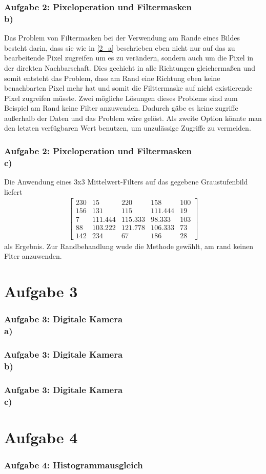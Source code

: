\documentclass[accentcolor=tud1a,colorbacktitle,inverttitle,landscape,german,presentation,t]{tudbeamer}
\begin{document}
	\begin{frame}
		\frametitle{Aufgabe 2: Pixeloperation und Filtermasken \\ b)}
		Das Problem von Filtermasken bei der Verwendung am Rande eines Bildes besteht darin, dass sie wie in \ref{2_a} beschrieben eben nicht nur auf das zu bearbeitende Pixel zugreifen um es  zu verändern, sondern auch um die Pixel in der direkten Nachbarschaft. Dies gechieht in alle Richtungen gleichermaßen und somit entsteht das Problem, dass am Rand eine Richtung eben keine benachbarten Pixel mehr hat und somit die Filttermaske auf nicht existierende Pixel zugreifen müsste. Zwei mögliche Lösungen dieses Problems sind zum Beispiel am Rand keine Filter anzuwenden. Dadurch gäbe es keine zugriffe außerhalb der Daten und das Problem wäre gelöst. Als zweite Option könnte man den letzten verfügbaren Wert benutzen, um unzulässige Zugriffe zu vermeiden. 
	\end{frame}
	
	\begin{frame}
		\frametitle{Aufgabe 2: Pixeloperation und Filtermasken \\ c)}
	
		Die Anwendung eines 3x3 Mittelwert-Filters auf das gegebene Graustufenbild liefert
		\begin{align*}
		\begin{bmatrix}
		230 & 15 & 220 & 158 & 100 \\
		156 & 131 & 115 & 111.444 & 19\\
		7 & 111.444 & 115.333 & 98.333 & 103\\
		88 & 103.222 & 121.778 & 106.333 & 73\\
		142 &234 & 67 & 186 & 28
		\end{bmatrix}
		\end{align*}
		als Ergebnis. Zur Randbehandlung wude die Methode gewählt, am rand keinen Flter anzuwenden.
	\end{frame}

\section{Aufgabe 3}
	\begin{frame}
		\frametitle{Aufgabe 3: Digitale Kamera \\ a)}
	\end{frame}
	
	\begin{frame}
		\frametitle{Aufgabe 3: Digitale Kamera \\ b)}
	\end{frame}
	
	\begin{frame}
		\frametitle{Aufgabe 3: Digitale Kamera \\ c)}
	\end{frame}
\section{Aufgabe 4}
	\begin{frame}[t]
		\frametitle{Aufgabe 4: Histogrammausgleich}
	\end{frame}
\end{document}

